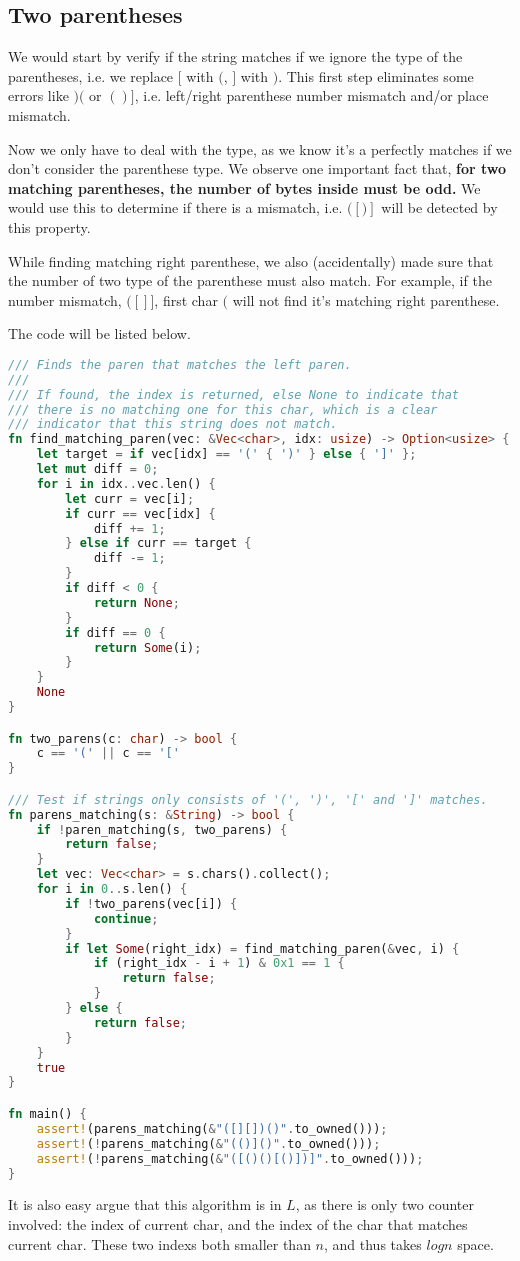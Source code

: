 \subsection*{Two parentheses}

We would start by verify if the string matches if we ignore the type of the parentheses, i.e. we replace $[$ with $($, $]$ with $)$.
This first step eliminates some errors like $)($ or $()]$, i.e. left/right parenthese number mismatch and/or place mismatch.

Now we only have to deal with the type, as we know it's a perfectly matches if we don't consider the parenthese type.
We observe one important fact that, \textbf{for two matching parentheses, the number of bytes inside must be odd.}
We would use this to determine if there is a mismatch, i.e. $([)]$ will be detected by this property.

While finding matching right parenthese, we also (accidentally) made sure that the number of two type of the parenthese must also match.
For example, if the number mismatch, $([]]$, first char $($ will not find it's matching right parenthese.

The code will be listed below.

\begin{lstlisting}[language=Rust]
/// Finds the paren that matches the left paren.
///
/// If found, the index is returned, else None to indicate that
/// there is no matching one for this char, which is a clear
/// indicator that this string does not match.
fn find_matching_paren(vec: &Vec<char>, idx: usize) -> Option<usize> {
    let target = if vec[idx] == '(' { ')' } else { ']' };
    let mut diff = 0;
    for i in idx..vec.len() {
        let curr = vec[i];
        if curr == vec[idx] {
            diff += 1;
        } else if curr == target {
            diff -= 1;
        }
        if diff < 0 {
            return None;
        }
        if diff == 0 {
            return Some(i);
        }
    }
    None
}

fn two_parens(c: char) -> bool {
    c == '(' || c == '['
}

/// Test if strings only consists of '(', ')', '[' and ']' matches.
fn parens_matching(s: &String) -> bool {
    if !paren_matching(s, two_parens) {
        return false;
    }
    let vec: Vec<char> = s.chars().collect();
    for i in 0..s.len() {
        if !two_parens(vec[i]) {
            continue;
        }
        if let Some(right_idx) = find_matching_paren(&vec, i) {
            if (right_idx - i + 1) & 0x1 == 1 {
                return false;
            }
        } else {
            return false;
        }
    }
    true
}

fn main() {
    assert!(parens_matching(&"([][])()".to_owned()));
    assert!(!parens_matching(&"(()]()".to_owned()));
    assert!(!parens_matching(&"([()()[()])]".to_owned()));
}
\end{lstlisting}

It is also easy argue that this algorithm is in $L$, as there is only two counter involved:
the index of current char, and the index of the char that matches current char.
These two indexs both smaller than $n$, and thus takes $log n$ space.


